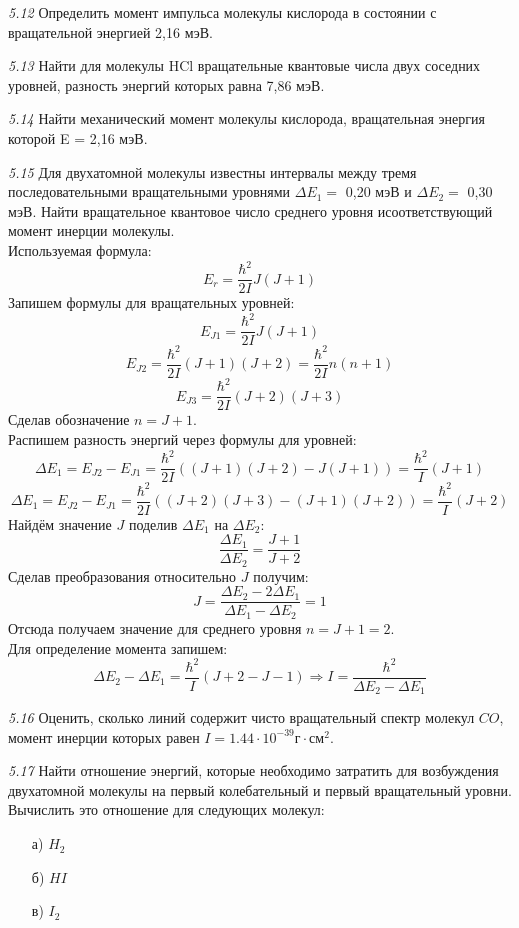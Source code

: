 	\emph{5.12 }
		Определить момент импульса молекулы кислорода в состоянии с
		вращательной энергией 2,16 мэВ.

	\emph{5.13 }
		Найти для молекулы HCl вращательные квантовые числа двух соседних
		уровней, разность энергий которых равна 7,86 мэВ.

	\emph{5.14 }
		Найти механический момент молекулы кислорода, вращательная энергия
		которой E = 2,16 мэВ.

	\emph{5.15 }
		Для двухатомной молекулы известны интервалы между тремя
		последовательными вращательными уровнями \( \Delta E_1 = \) 0,20 мэВ и
		\(\Delta E_2 = \) 0,30 мэВ. Найти вращательное квантовое число 
		среднего уровня исоответствующий момент инерции молекулы. \\
		Используемая формула: \[ E_r = \frac{\hbar^2}{2I}J(J+1) \]
		Запишем формулы для вращательных уровней:
		\[ E_{J1} = \frac{\hbar^2}{2I}J(J+1) \]
		\[ E_{J2} = \frac{\hbar^2}{2I}(J+1)(J+2) = \frac{\hbar^2}{2I}n(n+1) \]
		\[ E_{J3} = \frac{\hbar^2}{2I}(J+2)(J+3) \]
		Сделав обозначение \( n = J + 1 \). \\
		Распишем разность энергий через формулы для уровней:
		\[ 
			\Delta E_1 = E_{J2} - E_{J1} = 
			\frac{\hbar^2}{2I}((J+1)(J+2) - J(J+1)) = \frac{\hbar^2}{I}(J+1) 
		\]
		\[ 
			\Delta E_1 = E_{J2} - E_{J1} =
			\frac{\hbar^2}{2I}((J+2)(J+3)-(J+1)(J+2)) = \frac{\hbar^2}{I}(J+2)
		\]
		Найдём значение \( J \) поделив \( \Delta E_1 \) на \( \Delta E_2 \):
		\[ \frac{\Delta E_1}{\Delta E_2} = \frac{J+1}{J+2} \]
		Сделав преобразования относительно \( J \) получим:
		\[ J = \frac{\Delta E_2 - 2\Delta E_1}{\Delta E_1 - \Delta E_2} = 1 \]
		Отсюда получаем значение для среднего уровня \( n = J+1 = 2 \). \\
		Для определение момента запишем: 
		\[ 
			\Delta E_2 - \Delta E_1 = \frac{\hbar^2}{I}(J+2-J-1) 
			\Rightarrow I = \frac{\hbar^2}{\Delta E_2 - \Delta E_1}
		\]

	\emph{5.16 }
		Оценить, сколько линий содержит чисто вращательный спектр молекул
		\( CO \), момент инерции которых равен 
		\( I = 1.44\cdot10^{-39} \text{г}\cdot\text{см}^2 \).

	\emph{5.17 }
		Найти отношение энергий, которые необходимо затратить для
		возбуждения двухатомной молекулы на первый колебательный и первый
		вращательный уровни. Вычислить это отношение для следующих молекул:
		\vspace*{-1em} 
		\begin{itemize}\itemsep-8pt
			\item[а)] \( H_2 \)
			\item[б)] \( HI \)
			\item[в)] \( I_2 \)
		\end{itemize}
